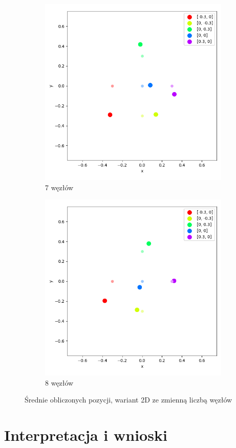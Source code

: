 \begin{figure}[H]
\ContinuedFloat\centering
\begin{subfigure}{.5\textwidth}
    \centering
    \includegraphics[width=\linewidth]{pics/mult_lat_2d_num/positions_7_mean.png}
\caption{7 węzłów}
\label{pic:2d_7_num_mult}
\end{subfigure}%
\begin{subfigure}{.5\textwidth}
    \centering
    \includegraphics[width=\linewidth]{pics/mult_lat_2d_num/positions_8_mean.png}
\caption{8 węzłów}
\label{pic:2d_8_num_mult}
\end{subfigure}
\caption{Średnie obliczonych pozycji, wariant 2D ze zmienną liczbą węzłów}
\label{pic:2d_num_mult}
\end{figure}

\section{Interpretacja i wnioski}

